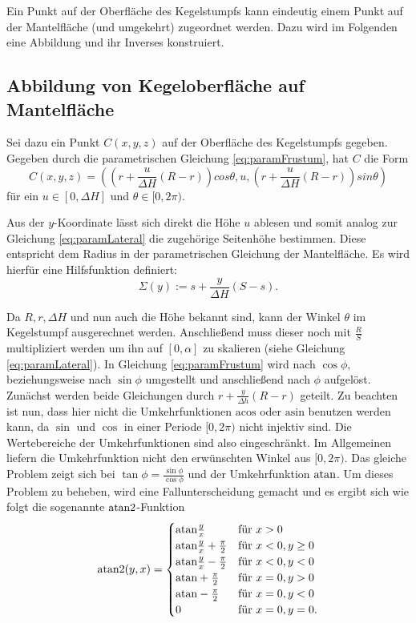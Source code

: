 \newpage
Ein Punkt auf der Oberfläche des Kegelstumpfs kann eindeutig einem Punkt auf der Mantelfläche (und umgekehrt) zugeordnet werden. Dazu wird im Folgenden eine Abbildung und ihr Inverses konstruiert.

\subsection{Abbildung von Kegeloberfläche auf Mantelfläche}
Sei dazu ein Punkt $C(x,y,z)$ auf der Oberfläche des Kegelstumpfs gegeben. Gegeben durch die parametrischen Gleichung \ref{eq:paramFrustum}, hat $C$ die Form
\[
C(x,y,z) = \left(\left(r + \frac{u}{\Delta H} (R - r)\right)cos \theta, u, \left(r + \frac{u}{\Delta H} (R - r)\right)sin \theta\right)
\]  für ein $u\in [0, \Delta H]$ und $\theta \in [0, 2\pi)$.

Aus der $y$-Koordinate lässt sich direkt die Höhe $u$ ablesen und somit analog zur Gleichung \ref{eq:paramLateral} die zugehörige Seitenhöhe bestimmen. Diese entspricht dem Radius in der parametrischen Gleichung  der Mantelfläche.  Es wird hierfür eine Hilfsfunktion definiert:
\begin{equation} \label{eq:help1}
	\Sigma(y) := s + \frac{y}{\Delta H} (S-s).
\end{equation}


Da $R, r, \Delta H$  und nun auch die Höhe bekannt sind, kann der Winkel $\theta$ im Kegelstumpf ausgerechnet werden. Anschließend muss dieser noch mit  $\frac{R}{S}$ multipliziert werden um ihn auf $[0, \alpha]$ zu skalieren (siehe Gleichung \ref{eq:paramLateral}).  In Gleichung \ref{eq:paramFrustum} wird nach $\cos\phi$, beziehungsweise nach $\sin\phi$ umgestellt und anschließend nach $\phi$ aufgelöst.
Zunächst werden beide Gleichungen durch $r + \frac{y}{\Delta h} (R - r)$ geteilt. Zu beachten ist nun, dass hier nicht die Umkehrfunktionen $\text{acos}$ oder $\text{asin}$ benutzen werden kann, da $\sin$ und $\cos$ in einer Periode $[0, 2\pi)$ nicht injektiv sind. Die Wertebereiche der Umkehrfunktionen sind also eingeschränkt. Im Allgemeinen liefern die Umkehrfunktion nicht den erwünschten Winkel aus $[0, 2\pi)$.
Das gleiche Problem zeigt sich bei $\tan\phi = \frac{\sin\phi}{\cos\phi}$ und der Umkehrfunktion $\text{atan}$. Um dieses Problem zu beheben, wird eine Fallunterscheidung gemacht und es ergibt sich wie folgt die sogenannte $\text{atan2}$-Funktion
\[
\text{atan2}(y,x) = 	\begin{cases}
					\text{atan} \frac{y}{x} 					& \mbox{für } x > 0 \\
					\text{atan} \frac{y}{x} + \frac{\pi}{2}	& \mbox{für } x < 0, y \geq 0 \\
					\text{atan} \frac{y}{x} - \frac{\pi}{2}	& \mbox{für } x < 0, y < 0 \\
					\text{atan} +\frac{\pi}{2}				& \mbox{für } x = 0, y > 0 \\
					\text{atan} -\frac{\pi}{2}				& \mbox{für } x = 0, y < 0 \\
					0									& \mbox{für } x = 0, y = 0.
				\end{cases}
\]

